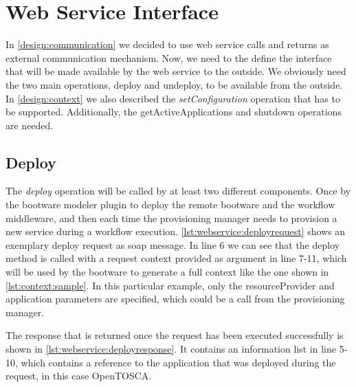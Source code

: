 \section{Web Service Interface}
\label{implementation:webservice}

In \autoref{design:communication} we decided to use web service calls and returns as external communication mechanism.
Now, we need to the define the interface that will be made available by the web service to the outside.
We obviously need the two main operations, deploy and undeploy, to be available from the outside.
In \autoref{design:context} we also described the \textit{setConfiguration} operation that has to be supported.
Additionally, the getActiveApplications and shutdown operations are needed.

\subsection{Deploy}

The \textit{deploy} operation will be called by at least two different components.
Once by the bootware modeler plugin to deploy the remote bootware and the workflow middleware, and then each time the provisioning manager needs to provision a new service during a workflow execution.
\autoref{lst:webservice:deployrequest} shows an exemplary deploy request as soap message.
In line 6 we can see that the deploy method is called with a request context provided as argument in line 7-11, which will be used by the bootware to generate a full context like the one shown in \autoref{lst:context:sample}.
In this particular example, only the resourceProvider and application parameters are specified, which could be a call from the provisioning manager.

\vspace*{\baselineskip}

The response that is returned once the request has been executed successfully is shown in \autoref{lst:webservice:deployresponse}.
It contains an information list in line 5-10, which contains a reference to the application that was deployed during the request, in this case OpenTOSCA.

